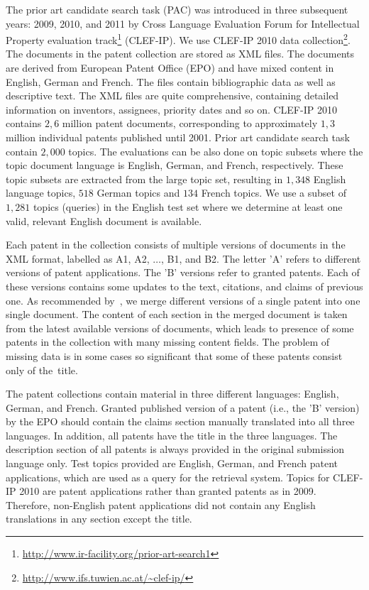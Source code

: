 The prior art candidate search task (PAC) was introduced in three subsequent years: 
2009, 2010, and 2011 by Cross Language Evaluation Forum for Intellectual Property evaluation track\footnote{\url{http://www.ir-facility.org/prior-art-search1}} (CLEF-IP). 
We use CLEF-IP 2010 data collection\footnote{\url{http://www.ifs.tuwien.ac.at/~clef-ip/}}. 
The documents in the patent collection are stored as XML files. The documents are derived from 
European Patent Office (EPO) and have mixed content in English, German and French.
The files contain bibliographic data as well as descriptive text. The XML files are quite comprehensive, 
containing detailed information on inventors, assignees, priority dates and so on.
CLEF-IP 2010 contains $  2,6  $ million patent documents, corresponding to approximately $ 1,3 $ 
million individual patents published until 2001. Prior art candidate search task contain $2,000$ topics.
The evaluations can be also done on topic subsets where the topic document language is English, German, and French, 
respectively. These topic subsets are extracted from the large topic set, resulting in $1,348$ English language topics, 
$518$ German topics and $134$ French topics. We use a subset of $1,281$ topics (queries)
in the English test set where we determine at least one
valid, relevant English document is available.

Each patent in the collection consists of multiple versions of documents in the XML format, labelled as A1, A2, $\ldots$, B1, and B2. The letter 'A' refers to different versions of patent applications. The 'B' versions refer to granted patents. Each of these versions contains some updates to the text, citations, and claims of previous one. As recommended by~\cite{magdy2012toward}, we merge different versions of a single patent into one single document. The content of each section in the merged document is taken from the latest available versions of documents, which leads to presence of some patents in the collection with many missing content fields. The problem of missing data is in some cases so significant that some of these patents consist only of the~title.

The patent collections contain material in three different languages: English, German, and French. Granted published version of a patent (i.e., the 'B' version) by the EPO should contain the claims section manually translated into all three languages. In addition, all patents have the title in the three languages. The description section of all patents is always provided in the original submission language only.
Test topics provided are English, German, and French patent applications, which are used as a query for the retrieval system. Topics for CLEF-IP 2010 are patent applications rather than granted patents as in 2009. Therefore, non-English patent applications did not contain any English translations in any section except the title.%

